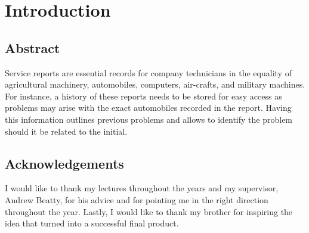 \chapter{Introduction}

\section{Abstract}
Service reports are essential records for company technicians in the equality of agricultural machinery, automobiles, computers, air-crafts, and military machines. For instance, a history of these reports needs to be stored for easy access as problems may arise with the exact automobiles recorded in the report. Having this information outlines previous problems and allows to identify the problem should it be related to the initial.

\section{Acknowledgements}
 I would like to thank my lectures throughout the years and my supervisor, Andrew Beatty, for his advice and for pointing me in the right direction throughout the year. Lastly, I would like to thank my brother for inspiring the idea that turned into a successful final product.

